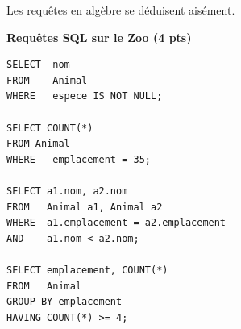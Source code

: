 \documentclass{article}
\begin{document}
Les requ\^etes en alg\`ebre se d\'eduisent ais\'ement.

\smallskip
{\bf Requ\^etes SQL sur le Zoo ({\bf 4 pts})}
 
\begin{verbatim}
SELECT  nom
FROM    Animal
WHERE   espece IS NOT NULL;

SELECT COUNT(*)
FROM Animal
WHERE   emplacement = 35;

SELECT a1.nom, a2.nom
FROM   Animal a1, Animal a2
WHERE  a1.emplacement = a2.emplacement
AND    a1.nom < a2.nom;

SELECT emplacement, COUNT(*)
FROM   Animal
GROUP BY emplacement
HAVING COUNT(*) >= 4;

\end{verbatim}
\end{document}
